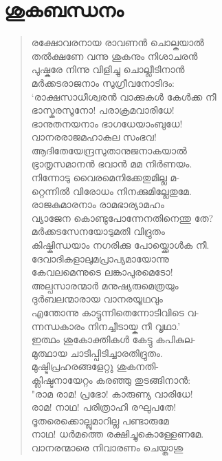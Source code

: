 
\section{ശുകബന്ധനം}

\begin{verse}
രക്ഷോവരനായ രാവണന്‍ ചൊല്കയാല്‍\\
തല്‍ക്ഷണേ വന്നു ശുകനും നിശാചരന്‍\\
പുഷ്കരേ നിന്നു വിളിച്ചു ചൊല്ലീടിനാന്‍\\
മര്‍ക്കടരാജനാം സുഗ്രീവനോടിദം:\\
‘രാക്ഷസാധീശ്വരന്‍ വാക്കുകള്‍ കേള്‍ക്ക നീ\\
ഭാസ്കരസൂനോ! പരാക്രമവാരിധേ!\\
ഭാനുതനയനാം ഭാഗധേയാംബുധേ!\\
വാനരരാജമഹാകുല സംഭവ!\\
ആദിതേയേന്ദ്രസുതാനുജനാകയാല്‍\\
ഭ്രാതൃസമാനന്‍ ഭവാന്‍ മമ നിര്‍ണയം.\\
നിന്നോടു വൈരമെനിക്കേതുമില്ല മ-\\
റ്റെന്നില്‍ വിരോധം നിനക്കുമില്ലേതുമേ.\\
രാജകുമാരനാം രാമഭാര്യാമഹം\\
വ്യാജേന കൊണ്ടുപോന്നേനതിനെന്തു തേ?\\
മര്‍ക്കടസേനയോടുമതി വിദ്രുതം\\
കിഷ്കിന്ധയാം നഗരിക്കു പോയ്ക്കൊള്‍ക നീ.\\
ദേവാദികളാലുമപ്രാപ്യമായോന്നു\\
കേവലമെന്നുടെ ലങ്കാപുരമെടോ!\\
അല്പസാരന്മാര്‍ മനുഷ്യരുമെത്രയും\\
ദുര്‍ബലന്മാരായ വാനരയൂഥവും\\
എന്തോന്നു കാട്ടുന്നിതെന്നോടിവിടെ വ-\\
ന്നന്ധകാരം നിനച്ചീടായ്ക നീ വൃഥാ.’\\
ഇത്ഥം ശുകോക്തികള്‍ കേട്ടു കപികുല-\\
മുത്ഥായ ചാടിപ്പിടിച്ചാരതിദ്രുതം.\\
മുഷ്ടിപ്രഹരങ്ങളേറ്റു ശുകനതി-\\
ക്ലിഷ്ടനായേറ്റം കരഞ്ഞു തുടങ്ങിനാന്‍:\\
"രാമ രാമ! പ്രഭോ! കാരുണ്യ വാരിധേ!\\
രാമ! നാഥ! പരിത്രാഹി രഘുപതേ!\\
ദൂതരെക്കൊല്ലുമാറില്ല പണ്ടാരുമേ\\
നാഥ! ധര്‍മത്തെ രക്ഷിച്ചുകൊള്ളേണമേ.\\
വാനരന്മാരെ നിവാരണം ചെയ്താശു\\

\end{verse}
